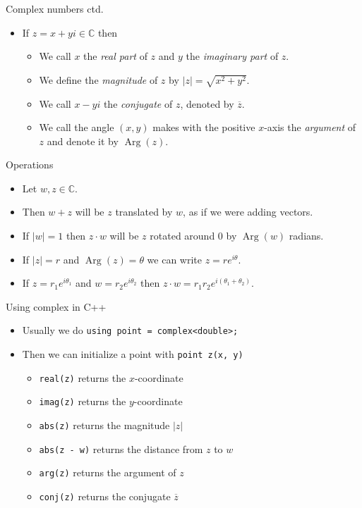 \documentclass{beamer}
\begin{document}
\begin{frame}[plain]{Complex numbers ctd.}
	\begin{itemize}
        \item If $z = x + yi \in \mathbb{C}$ then
		\begin{itemize}
            \item We call $x$ the \emph{real part} of $z$ and $y$ the \emph{imaginary part} of $z$.
            \item We define the \emph{magnitude} of $z$ by $|z| = \sqrt{x^2 + y^2}$.
            \item We call $x - yi$ the \emph{conjugate} of $z$, denoted by $\overline{z}$.
            \item We call the angle $(x, y)$ makes with the positive $x$-axis the \emph{argument} of $z$ and
                denote it by $\operatorname{Arg}(z)$.
        \end{itemize}
    \end{itemize}
\end{frame}

\begin{frame}[plain]{Operations}
	\begin{itemize}
        \item Let $w, z \in \mathbb{C}$.
        \item Then $w + z$ will be $z$ translated by $w$, as if we were adding vectors.
        \item If $|w| = 1$ then $z \cdot w$ will be $z$ rotated around $0$ by $\operatorname{Arg}(w)$ radians.
        \item If $|z| = r$ and $\operatorname{Arg}(z) = \theta$ we can write $z = re^{i\theta}$.
        \item If $z = r_1e^{i\theta_1}$ and $w = r_2e^{i\theta_2}$ then $z \cdot w = r_1 r_2 e^{i(\theta_1 + \theta_2)}$.
    \end{itemize}
\end{frame}

\begin{frame}[plain]{Using complex in C++}
    \begin{itemize}
        \item Usually we do \texttt{using point = complex<double>;}
        \item Then we can initialize a point with \texttt{point z(x, y)}
        \begin{itemize}
            \item \texttt{real(z)} returns the $x$-coordinate
            \item \texttt{imag(z)} returns the $y$-coordinate
            \item \texttt{abs(z)} returns the magnitude $|z|$
            \item \texttt{abs(z - w)} returns the distance from $z$ to $w$
            \item \texttt{arg(z)} returns the argument of $z$
            \item \texttt{conj(z)} returns the conjugate $\overline{z}$
        \end{itemize}
    \end{itemize}
\end{frame}
\end{document}
